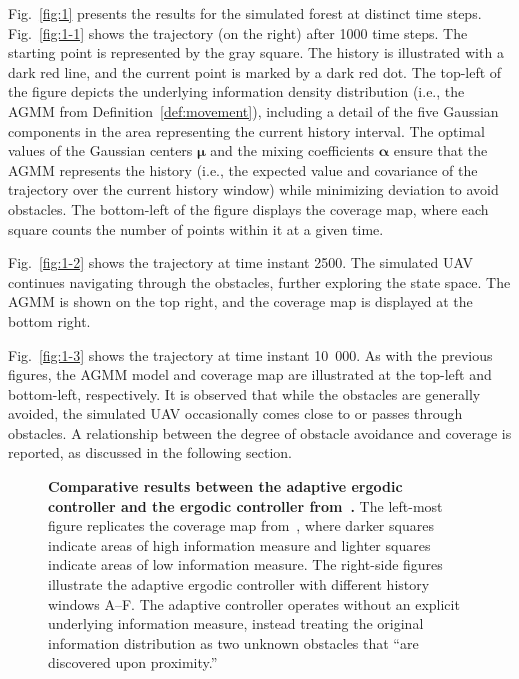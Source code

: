 \documentclass[letterpaper, 10 pt, conference, twoside]{IEEEtran}
\theoremstyle{definition}
\begin{document}
Fig.~\ref{fig:1} presents the results for the simulated forest at distinct time steps. Fig.~\ref{fig:1-1} shows the trajectory (on the right) after 1000 time steps. The starting point is represented by the gray square. The history is illustrated with a dark red line, and the current point is marked by a dark red dot. The top-left of the figure depicts the underlying information density distribution (i.e., the AGMM from Definition~\ref{def:movement}), including a detail of the five Gaussian components in the area representing the current history interval. The optimal values of the Gaussian centers $\boldsymbol{\mu}$ and the mixing coefficients $\boldsymbol{\alpha}$ ensure that the AGMM represents the history (i.e., the expected value and covariance of the trajectory over the current history window) while minimizing deviation to avoid obstacles. The bottom-left of the figure displays the coverage map, where each square counts the number of points within it at a given time.

Fig.~\ref{fig:1-2} shows the trajectory at time instant 2500. The simulated UAV continues navigating through the obstacles, further exploring the state space. The AGMM is shown on the top right, and the coverage map is displayed at the bottom right.

Fig.~\ref{fig:1-3} shows the trajectory at time instant 10~000. As with the previous figures, the AGMM model and coverage map are illustrated at the top-left and bottom-left, respectively. It is observed that while the obstacles are generally avoided, the simulated UAV occasionally comes close to or passes through obstacles. A relationship between the degree of obstacle avoidance and coverage is reported, as discussed in the following section.



\begin{figure}[t!]
  \begin{minipage}[t!]{.26\textwidth}
    \caption{\textbf{Comparative results between the adaptive ergodic controller and the ergodic controller from~\cite{calinon2020mixture}.} The left-most figure replicates the coverage map from~\cite{calinon2020mixture}, where darker squares indicate areas of high information measure and lighter squares indicate areas of low information measure. The right-side figures illustrate the adaptive ergodic controller with different history windows A--F. The adaptive controller operates without an explicit underlying information measure, instead treating the original information distribution as two unknown obstacles that ``are discovered upon proximity.''}
    \label{fig:c}
  \end{minipage}\hspace*{.5cm}
  \begin{minipage}[t!]{.72\textwidth}
  \centering
  
  \end{minipage}
\end{figure}
\end{document}
